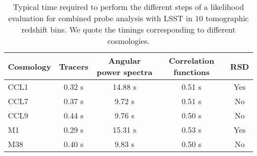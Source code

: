
%
\begin{table*}[ht]
  \centering
  \begin{tabular}{ l|c c c c}
    \hline
    Cosmology & Tracers & Angular power spectra & Correlation functions & RSD\\
    \hline
    CCL1 & 0.32 s & 14.88 s & 0.51 s & Yes\\
    CCL7 & 0.37 s & 9.72 s & 0.51 s & No\\
    CCL9 & 0.44 s &  9.76 s &  0.50 s & No\\
    M1 & 0.29 s & 15.31 s & 0.53 s & Yes\\
    M38 & 0.40 s &  9.83 s & 0.50 s & No\\
    \hline
  \end{tabular}
  \caption{Typical time required to perform the different steps of a likelihood evaluation for combined probe analysis with LSST in $10$ tomographic redshift bins. We quote the timings corresponding to different cosmologies.}
  \label{tab:liketime}
\end{table*}
